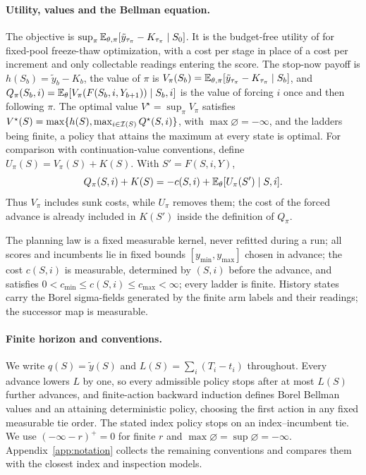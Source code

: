 \paragraph{Utility, values and the Bellman equation.}
The objective is $\sup_\pi\mathbb{E}_{\theta,\pi}[\tilde y_{\tau_\pi}-K_{\tau_\pi}\mid S_0]$. It is the
budget-free utility of \citet{vu2026coststop} for fixed-pool freeze-thaw optimization, with a
cost per stage in place of a cost per increment and only collectable readings entering the
score. The stop-now payoff is $h(S_b)=\tilde y_b-K_b$, the value of $\pi$ is
$V_\pi(S_b)=\mathbb{E}_{\theta,\pi}[\tilde y_{\tau_\pi}-K_{\tau_\pi}\mid S_b]$, and
$Q_\pi(S_b,i)=\mathbb{E}_\theta[V_\pi(F(S_b,i,Y_{b+1}))\mid S_b,i]$ is the value of forcing $i$ once and
then following $\pi$. The optimal value $V^\star=\sup_\pi V_\pi$ satisfies
$V^\star(S)=\max\{h(S),\max_{i\in\mathcal{I}(S)}Q^\star(S,i)\}$, with $\max\varnothing=-\infty$, and the
ladders being finite, a policy that attains the maximum at every state is optimal.
For comparison with continuation-value conventions, define
$U_\pi(S)=V_\pi(S)+K(S)$. With $S'=F(S,i,Y)$,
\[
 Q_\pi(S,i)+K(S)=-c(S,i)+\mathbb{E}_\theta[U_\pi(S')\mid S,i].
\]
Thus $V_\pi$ includes sunk costs, while $U_\pi$ removes them; the cost of the
forced advance is already included in $K(S')$ inside the definition of $Q_\pi$.

\begin{assumption}\label{assm:standing}
The planning law is a fixed measurable kernel, never refitted during a run; all scores and
incumbents lie in fixed bounds $[y_{\min},y_{\max}]$ chosen in advance; the cost $c(S,i)$ is measurable, determined by
$(S,i)$ before the advance, and satisfies $0<c_{\min}\le c(S,i)\le c_{\max}<\infty$; every ladder
is finite. History states carry the Borel sigma-fields generated by the finite arm labels and
their readings; the successor map is measurable.
\end{assumption}

\paragraph{Finite horizon and conventions.}
We write $q(S)=\tilde y(S)$ and $L(S)=\sum_i(T_i-t_i)$ throughout. Every advance lowers $L$
by one, so every admissible policy stops after at most $L(S)$ further advances, and
finite-action backward induction defines Borel Bellman values and an attaining deterministic
policy, choosing the first action in any fixed measurable tie order. The stated index policy
stops on an index--incumbent tie. We use $(-\infty-r)^+=0$ for finite $r$ and
$\max\varnothing=\sup\varnothing=-\infty$. Appendix~\ref{app:notation} collects the remaining
conventions and compares them with the closest index and inspection models.

